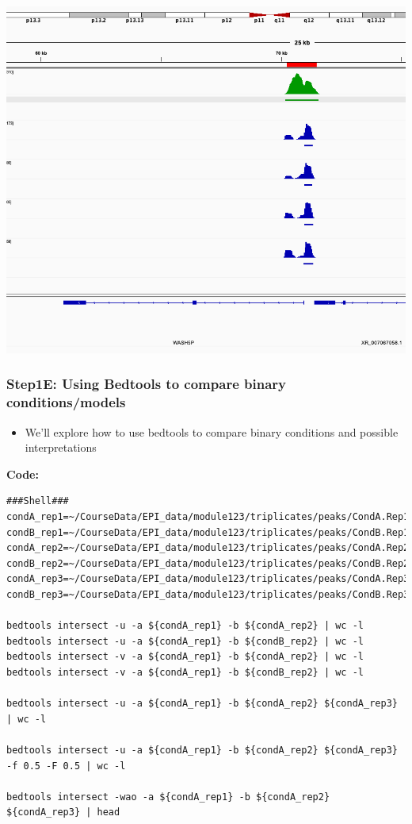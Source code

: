 \documentclass[
]{book}
\providecommand{\tightlist}{%
  \setlength{\itemsep}{0pt}\setlength{\parskip}{0pt}}
\begin{document}
\includegraphics{./img/MCF10A-pLPMBLS.png}

\subsubsection{Step1E: Using Bedtools to compare binary conditions/models}\label{step1e-using-bedtools-to-compare-binary-conditionsmodels}

\begin{itemize}
\tightlist
\item
  We'll explore how to use bedtools to compare binary conditions and possible interpretations
\end{itemize}

\textbf{Code:}

\begin{verbatim}
###Shell###
condA_rep1=~/CourseData/EPI_data/module123/triplicates/peaks/CondA.Rep1_peaks.narrowPeak  
condB_rep1=~/CourseData/EPI_data/module123/triplicates/peaks/CondB.Rep1_peaks.narrowPeak
condA_rep2=~/CourseData/EPI_data/module123/triplicates/peaks/CondA.Rep2_peaks.narrowPeak  
condB_rep2=~/CourseData/EPI_data/module123/triplicates/peaks/CondB.Rep2_peaks.narrowPeak
condA_rep3=~/CourseData/EPI_data/module123/triplicates/peaks/CondA.Rep3_peaks.narrowPeak
condB_rep3=~/CourseData/EPI_data/module123/triplicates/peaks/CondB.Rep3_peaks.narrowPeak

bedtools intersect -u -a ${condA_rep1} -b ${condA_rep2} | wc -l
bedtools intersect -u -a ${condA_rep1} -b ${condB_rep2} | wc -l 
bedtools intersect -v -a ${condA_rep1} -b ${condA_rep2} | wc -l
bedtools intersect -v -a ${condA_rep1} -b ${condB_rep2} | wc -l

bedtools intersect -u -a ${condA_rep1} -b ${condA_rep2} ${condA_rep3} | wc -l

bedtools intersect -u -a ${condA_rep1} -b ${condA_rep2} ${condA_rep3} -f 0.5 -F 0.5 | wc -l

bedtools intersect -wao -a ${condA_rep1} -b ${condA_rep2} ${condA_rep3} | head
\end{verbatim}
\end{document}
